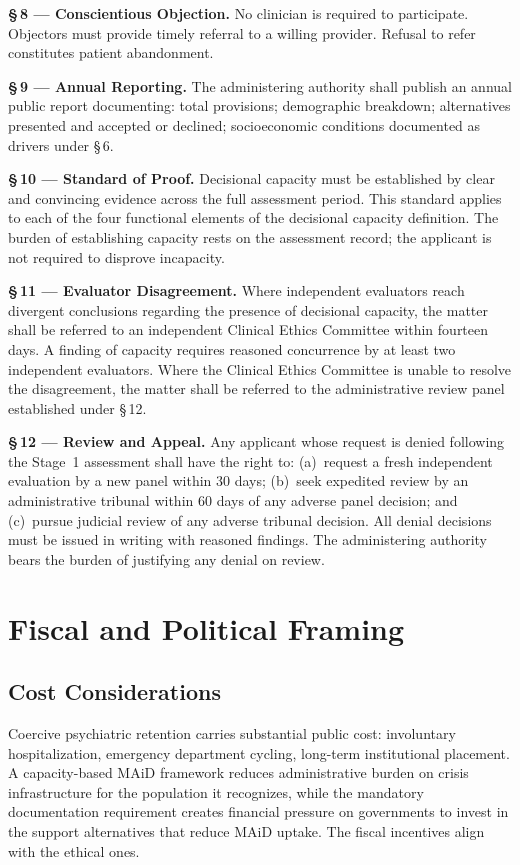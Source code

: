 \documentclass[11pt, letterpaper]{article}
\begin{document}
\begin{statutebox}
\textbf{\S\,8 --- Conscientious Objection.}
No clinician is required to participate. Objectors must provide timely referral to a
willing provider. Refusal to refer constitutes patient abandonment.

\textbf{\S\,9 --- Annual Reporting.}
The administering authority shall publish an annual public report documenting: total
provisions; demographic breakdown; alternatives presented and accepted or declined;
socioeconomic conditions documented as drivers under \S\,6.

\textbf{\S\,10 --- Standard of Proof.}
Decisional capacity must be established by clear and convincing evidence across the full
assessment period. This standard applies to each of the four functional elements of the
decisional capacity definition. The burden of establishing capacity rests on the assessment
record; the applicant is not required to disprove incapacity.

\textbf{\S\,11 --- Evaluator Disagreement.}
Where independent evaluators reach divergent conclusions regarding the presence of
decisional capacity, the matter shall be referred to an independent Clinical Ethics Committee
within fourteen days. A finding of capacity requires reasoned concurrence by at least two
independent evaluators. Where the Clinical Ethics Committee is unable to resolve the
disagreement, the matter shall be referred to the administrative review panel established
under \S\,12.

\textbf{\S\,12 --- Review and Appeal.}
Any applicant whose request is denied following the Stage~1 assessment shall have the
right to: (a)~request a fresh independent evaluation by a new panel within 30 days;
(b)~seek expedited review by an administrative tribunal within 60 days of any adverse
panel decision; and (c)~pursue judicial review of any adverse tribunal decision. All
denial decisions must be issued in writing with reasoned findings. The administering
authority bears the burden of justifying any denial on review.
\end{statutebox}

\section{Fiscal and Political Framing}

\subsection{Cost Considerations}

Coercive psychiatric retention carries substantial public cost: involuntary hospitalization,
emergency department cycling, long-term institutional placement. A capacity-based MAiD
framework reduces administrative burden on crisis infrastructure for the population it
recognizes, while the mandatory documentation requirement creates financial pressure on
governments to invest in the support alternatives that reduce MAiD uptake. The fiscal
incentives align with the ethical ones.
\end{document}

